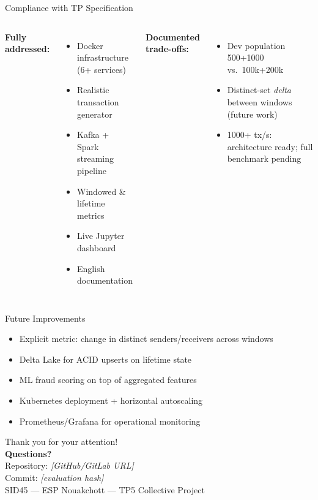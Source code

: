 \documentclass[aspectratio=169,11pt]{beamer}
\begin{document}
\begin{frame}{Compliance with TP Specification}
  \begin{columns}[T]
    \textbf{Fully addressed:}
    \begin{itemize}
      \item Docker infrastructure (6+ services)
      \item Realistic transaction generator
      \item Kafka + Spark streaming pipeline
      \item Windowed \& lifetime metrics
      \item Live Jupyter dashboard
      \item English documentation
    \end{itemize}
    \textbf{Documented trade-offs:}
    \begin{itemize}
      \item Dev population 500+1000 vs.\ 100k+200k
      \item Distinct-set \textit{delta} between windows (future work)
      \item 1000+ tx/s: architecture ready; full benchmark pending
    \end{itemize}
  \end{columns}
\end{frame}

\begin{frame}{Future Improvements}
  \begin{itemize}
    \item Explicit metric: change in distinct senders/receivers across windows
    \item Delta Lake for ACID upserts on lifetime state
    \item ML fraud scoring on top of aggregated features
    \item Kubernetes deployment + horizontal autoscaling
    \item Prometheus/Grafana for operational monitoring
  \end{itemize}
\end{frame}

\begin{frame}
  \centering
  \Large Thank you for your attention!\\
  \vspace{1em}
  \normalsize
  \textbf{Questions?}\\
  \vspace{0.8em}
  Repository: \textit{[GitHub/GitLab URL]}\\
  Commit: \textit{[evaluation hash]}\\
  \vspace{0.5em}
  \small SID45 — ESP Nouakchott — TP5 Collective Project
\end{frame}
\end{document}

